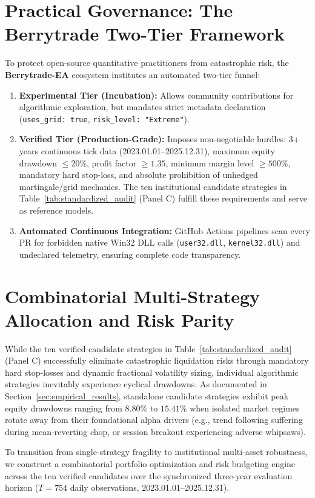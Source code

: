 \documentclass[11pt,a4paper]{article}
\begin{document}
\section{Practical Governance: The Berrytrade Two-Tier Framework}
To protect open-source quantitative practitioners from catastrophic risk, the \textbf{Berrytrade-EA} ecosystem institutes an automated two-tier funnel:
\begin{enumerate}
    \item \textbf{Experimental Tier (Incubation):} Allows community contributions for algorithmic exploration, but mandates strict metadata declaration (\texttt{uses\_grid: true}, \texttt{risk\_level: "Extreme"}).
    \item \textbf{Verified Tier (Production-Grade):} Imposes non-negotiable hurdles: 3+ years continuous tick data (2023.01.01--2025.12.31), maximum equity drawdown $\le 20\%$, profit factor $\ge 1.35$, minimum margin level $\ge 500\%$, mandatory hard stop-loss, and absolute prohibition of unhedged martingale/grid mechanics. The ten institutional candidate strategies in Table~\ref{tab:standardized_audit} (Panel C) fulfill these requirements and serve as reference models.
    \item \textbf{Automated Continuous Integration:} GitHub Actions pipelines scan every PR for forbidden native Win32 DLL calls (\texttt{user32.dll}, \texttt{kernel32.dll}) and undeclared telemetry, ensuring complete code transparency.
\end{enumerate}

\section{Combinatorial Multi-Strategy Allocation and Risk Parity}
\label{sec:portfolio_allocation}

While the ten verified candidate strategies in Table~\ref{tab:standardized_audit} (Panel C) successfully eliminate catastrophic liquidation risks through mandatory hard stop-losses and dynamic fractional volatility sizing, individual algorithmic strategies inevitably experience cyclical drawdowns. As documented in Section~\ref{sec:empirical_results}, standalone candidate strategies exhibit peak equity drawdowns ranging from $8.80\%$ to $15.41\%$ when isolated market regimes rotate away from their foundational alpha drivers (e.g., trend following suffering during mean-reverting chop, or session breakout experiencing adverse whipsaws). 

To transition from single-strategy fragility to institutional multi-asset robustness, we construct a combinatorial portfolio optimization and risk budgeting engine across the ten verified candidates over the synchronized three-year evaluation horizon ($T = 754$ daily observations, 2023.01.01--2025.12.31).
\end{document}
